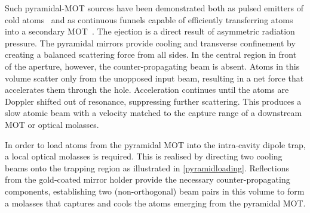 \documentclass[../Thesis-IJspeert.tex]{subfiles}
\begin{document}
Such pyramidal-MOT sources have been demonstrated both as pulsed emitters of cold atoms~\cite{Arlt1998} and as continuous funnels capable of efficiently transferring atoms into a secondary MOT~\cite{Williamson1998}. The ejection is a direct result of asymmetric radiation pressure. The pyramidal mirrors provide cooling and transverse confinement by creating a balanced scattering force from all sides. In the central region in front of the aperture, however, the counter-propagating beam is absent. Atoms in this volume scatter only from the unopposed input beam, resulting in a net force that accelerates them through the hole. Acceleration continues until the atoms are Doppler shifted out of resonance, suppressing further scattering. This produces a slow atomic beam with a velocity matched to the capture range of a downstream MOT or optical molasses.

In order to load atoms from the pyramidal MOT into the intra-cavity dipole trap, a local optical molasses is required. This is realised by directing two cooling beams onto the trapping region as illustrated in \autoref{pyramidloading}. Reflections from the gold-coated mirror holder provide the necessary counter-propagating components, establishing two (non-orthogonal) beam pairs in this volume to form a molasses that captures and cools the atoms emerging from the pyramidal MOT.
\end{document}
